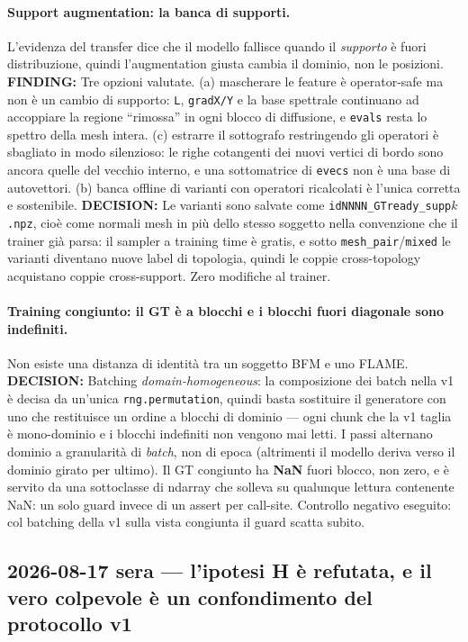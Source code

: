 \documentclass[11pt,a4paper]{article}
\newcommand{\finding}[1]{\textcolor{finding}{\textbf{FINDING:}} #1}
\newcommand{\decision}[1]{\textcolor{decision}{\textbf{DECISION:}} #1}
\begin{document}
\paragraph{Support augmentation: la banca di supporti.}
L'evidenza del transfer dice che il modello fallisce quando il \emph{supporto} \`e fuori
distribuzione, quindi l'augmentation giusta cambia il dominio, non le posizioni.
\finding{Tre opzioni valutate. (a) mascherare le feature \`e operator-safe ma non \`e un
cambio di supporto: \texttt{L}, \texttt{gradX/Y} e la base spettrale continuano ad
accoppiare la regione ``rimossa'' in ogni blocco di diffusione, e \texttt{evals} resta lo
spettro della mesh intera. (c) estrarre il sottografo restringendo gli operatori \`e
sbagliato in modo silenzioso: le righe cotangenti dei nuovi vertici di bordo sono ancora
quelle del vecchio interno, e una sottomatrice di \texttt{evecs} non \`e una base di
autovettori. (b) banca offline di varianti con operatori ricalcolati \`e l'unica corretta
e sostenibile.}
\decision{Le varianti sono salvate come \texttt{idNNNN\_GTready\_supp$k$.npz}, cio\`e come
normali mesh in pi\`u dello stesso soggetto nella convenzione che il trainer gi\`a parsa:
il sampler a training time \`e gratis, e sotto \texttt{mesh\_pair}/\texttt{mixed} le
varianti diventano nuove label di topologia, quindi le coppie cross-topology acquistano
coppie cross-support. Zero modifiche al trainer.}

\paragraph{Training congiunto: il GT \`e a blocchi e i blocchi fuori diagonale sono indefiniti.}
Non esiste una distanza di identit\`a tra un soggetto BFM e uno FLAME.
\decision{Batching \emph{domain-homogeneous}: la composizione dei batch nella v1 \`e
decisa da un'unica \texttt{rng.permutation}, quindi basta sostituire il generatore con uno
che restituisce un ordine a blocchi di dominio --- ogni chunk che la v1 taglia \`e
mono-dominio e i blocchi indefiniti non vengono mai letti. I passi alternano dominio a
granularit\`a di \emph{batch}, non di epoca (altrimenti il modello deriva verso il dominio
girato per ultimo). Il GT congiunto ha \textbf{NaN} fuori blocco, non zero, e \`e servito
da una sottoclasse di ndarray che solleva su qualunque lettura contenente NaN: un solo
guard invece di un assert per call-site. Controllo negativo eseguito: col batching della
v1 sulla vista congiunta il guard scatta subito.}

\subsection{2026-08-17 sera --- l'ipotesi H \`e refutata, e il vero colpevole \`e un confondimento del protocollo v1}
\end{document}
